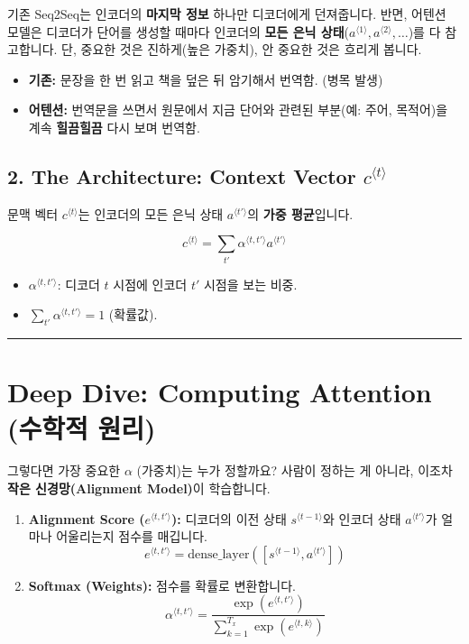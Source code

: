 \documentclass[11pt,a4paper]{book}
\theoremstyle{definition}
\begin{document}
기존 Seq2Seq는 인코더의 \textbf{마지막 정보} 하나만 디코더에게 던져줍니다. 반면, 어텐션 모델은 디코더가 단어를 생성할 때마다 인코더의 \textbf{모든 은닉 상태}($a^{\langle 1 \rangle}, a^{\langle 2 \rangle}, \dots$)를 다 참고합니다. 단, 중요한 것은 진하게(높은 가중치), 안 중요한 것은 흐리게 봅니다.

\begin{analogybox}[title={번역가의 힐끔거리기}]
\begin{itemize}
    \item \textbf{기존:} 문장을 한 번 읽고 책을 덮은 뒤 암기해서 번역함. (병목 발생)
    \item \textbf{어텐션:} 번역문을 쓰면서 원문에서 지금 단어와 관련된 부분(예: 주어, 목적어)을 계속 \textbf{힐끔힐끔} 다시 보며 번역함.
\end{itemize}
\end{analogybox}

\subsection{2. The Architecture: Context Vector $c^{\langle t \rangle}$}
문맥 벡터 $c^{\langle t \rangle}$는 인코더의 모든 은닉 상태 $a^{\langle t' \rangle}$의 \textbf{가중 평균}입니다.

\begin{formulabox}[title={Context Vector 공식}]
$$ c^{\langle t \rangle} = \sum_{t'} \alpha^{\langle t, t' \rangle} a^{\langle t' \rangle} $$
\begin{itemize}
    \item $\alpha^{\langle t, t' \rangle}$: 디코더 $t$ 시점에 인코더 $t'$ 시점을 보는 비중.
    \item $\sum_{t'} \alpha^{\langle t, t' \rangle} = 1$ (확률값).
\end{itemize}
\end{formulabox}

\vspace{0.5cm}\hrule\vspace{0.5cm}

\section{Deep Dive: Computing Attention (수학적 원리)}

그렇다면 가장 중요한 $\alpha$ (가중치)는 누가 정할까요? 사람이 정하는 게 아니라, 이조차 \textbf{작은 신경망(Alignment Model)}이 학습합니다.

\begin{enumerate}
    \item \textbf{Alignment Score ($e^{\langle t, t' \rangle}$):} 디코더의 이전 상태 $s^{\langle t-1 \rangle}$와 인코더 상태 $a^{\langle t' \rangle}$가 얼마나 어울리는지 점수를 매깁니다.
    $$ e^{\langle t, t' \rangle} = \text{dense\_layer}([s^{\langle t-1 \rangle}, a^{\langle t' \rangle}]) $$
    
    \item \textbf{Softmax (Weights):} 점수를 확률로 변환합니다.
    $$ \alpha^{\langle t, t' \rangle} = \frac{\exp(e^{\langle t, t' \rangle})}{\sum_{k=1}^{T_x} \exp(e^{\langle t, k \rangle})} $$
\end{enumerate}
\end{document}
